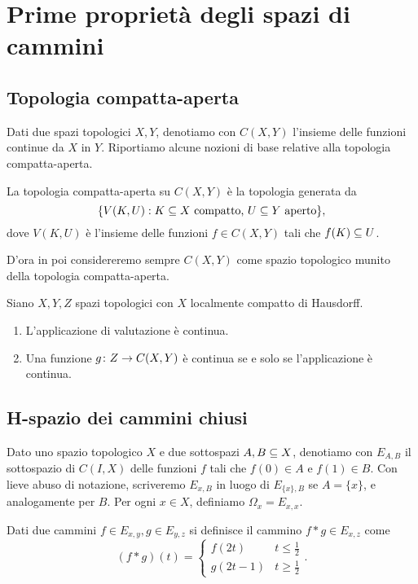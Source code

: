\section{Prime proprietà degli spazi di cammini}
\subsection{Topologia compatta-aperta}
Dati due spazi topologici $X,Y$, denotiamo con $C(X,Y)$ l'insieme delle funzioni continue da $X$ in $Y$. Riportiamo alcune nozioni di base relative alla topologia compatta-aperta.
\begin{definition}
La topologia compatta-aperta su $C(X,Y)$ è la topologia generata da 
$$
\{V(K,U):\text{$K\subseteq X$ compatto, $U\subseteq Y$ aperto}\},
$$
dove $V(K,U)$ è l'insieme delle funzioni $f\in C(X,Y)$ tali che $f(K)\subseteq U$.
\end{definition}
D'ora in poi considereremo sempre $C(X,Y)$ come spazio topologico munito della topologia compatta-aperta.
\begin{proposition}
Siano $X,Y,Z$ spazi topologici con $X$ localmente compatto di Hausdorff.
\begin{enumerate}
\item L'applicazione di valutazione
è continua.
\item Una funzione $g\colon Z\to C(X,Y)$ è continua se e solo se l'applicazione
è continua.
\end{enumerate}
\end{proposition}

\subsection{H-spazio dei cammini chiusi}

Dato uno spazio topologico $X$ e due sottospazi $A,B\subseteq X$, denotiamo con $E_{A,B}$ il sottospazio di $C(I,X)$ delle funzioni $f$ tali che $f(0)\in A$ e $f(1)\in B$. Con lieve abuso di notazione, scriveremo $E_{x,B}$ in luogo di $E_{\{x\},B}$ se $A=\{x\}$, e analogamente per $B$. Per ogni $x\in X$, definiamo $\Omega_x=E_{x,x}$.

Dati due cammini $f\in E_{x,y},g\in E_{y,z}$ si definisce il cammino $f\ast g\in E_{x,z}$ come
$$
(f\ast g)(t)=
\begin{cases}
f(2t)&t\le\frac{1}{2}\\
g(2t-1)&t\ge\frac{1}{2}
\end{cases}.
$$

